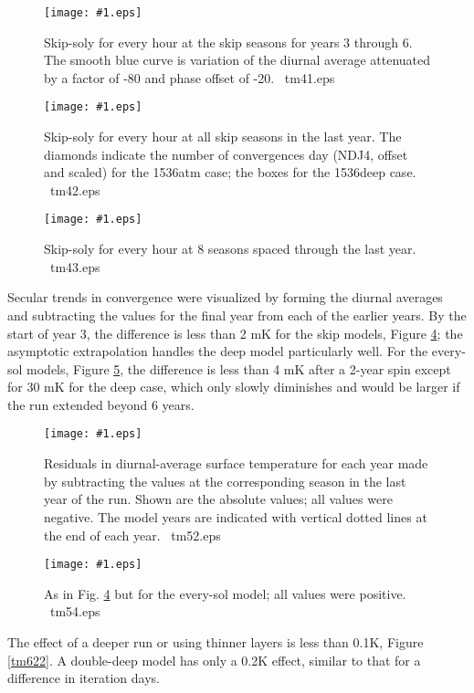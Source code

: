 \documentclass{article}  %
\newcommand{\igc}[1]{\texttt{[image: \#1.eps]}}  %
\begin{document}
\begin{figure}[!ht] \igc{tm41}
\caption[Skip-soly]{Skip-soly for every hour at the skip seasons for years 3
  through 6.  The smooth blue curve is variation of the diurnal average
  attenuated by a factor of -80 and phase offset of -20\qd.
  \ tm41.eps \label{tm41} } \end{figure}

\begin{figure}[!ht] \igc{tm42}
\caption[Skip-soly last year]{Skip-soly for every hour at all skip seasons in
  the last year.  The diamonds indicate the number of convergences day (NDJ4,
  offset and scaled) for the 1536atm case; the boxes for the 1536deep
  case. \ tm42.eps \label{tm42} } \end{figure}

\begin{figure}[!ht] \igc{tm43}
\caption[Skip-soly spaced seasons]{Skip-soly for every hour at 8 seasons spaced
  through the last year.  \ tm43.eps \label{tm43} } \end{figure}

Secular trends in convergence were visualized by forming the diurnal averages
and subtracting the values for the final year from each of the earlier years.
By the start of year 3, the difference is less than 2 mK for the skip models,
Figure \ref{tm52}; the asymptotic extrapolation handles the deep model
particularly well. For the every-sol models, Figure \ref{tm54}, the difference
is less than 4 mK after a 2-year spin except for 30 mK for the deep case, which
only slowly diminishes and would be larger if the run extended beyond 6 years.

\begin{figure}[!ht] \igc{tm52}
\caption[Skip secular]{Residuals in diurnal-average surface temperature for each
  year made by subtracting the values at the corresponding season in the last
  year of the run. Shown are the absolute values; all values were negative. The
  model years are indicated with vertical dotted lines at the end of each
  year. \ tm52.eps \label{tm52} } \end{figure}

\begin{figure}[!ht] \igc{tm54}
\caption[Soly secular]{As in Fig. \ref{tm52} but for the every-sol model; all
  values were positive.  \ tm54.eps \label{tm54} } \end{figure}

The effect of a deeper run or using thinner layers is less than 0.1K, Figure
\ref {tm622}. A double-deep model has only a 0.2K effect, similar to that for a
difference in iteration days.
 
\end{document}
